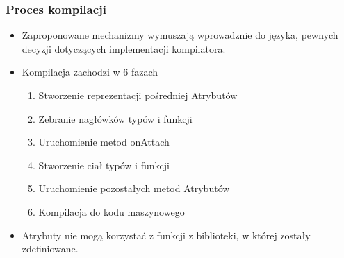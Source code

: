 \begin{frame}
	\frametitle{Proces kompilacji}

	\begin{itemize}
		\item Zaproponowane mechanizmy wymuszają wprowadznie do języka, pewnych decyzji dotyczących implementacji kompilatora.
		\item Kompilacja zachodzi w 6 fazach\begin{enumerate}
			\item Stworzenie reprezentacji pośredniej Atrybutów
			\item Zebranie nagłówków typów i funkcji
			\item Uruchomienie metod onAttach
			\item Stworzenie ciał typów i funkcji
			\item Uruchomienie pozostałych metod Atrybutów
			\item Kompilacja do kodu maszynowego
		\end{enumerate}
		\item Atrybuty nie mogą korzystać z funkcji z biblioteki, w której zostały zdefiniowane.
	\end{itemize}

\end{frame}
